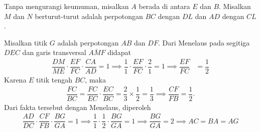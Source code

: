\begin{center}
\end{center}
Tanpa mengurangi keumuman, misalkan $A$ berada di antara $E$ dan $B$. Misalkan $M$ dan $N$ berturut-turut adalah perpotongan $BC$ dengan $DL$ dan $AD$ dengan $CL$.

    Misalkan titik $G$ adalah perpotongan $AB$ dan $DF$.
    Dari Menelaus pada segitiga $DEC$ dan garis transversal $\overline{AMF}$ didapat
    \begin{align*}
        \dfrac{DM}{ME}\cdot \dfrac{EF}{FC} \cdot \dfrac{CA}{AD} = 1 \implies
        \dfrac{1}{1}\cdot \dfrac{EF}{FC} \cdot \dfrac{2}{1} = 1 \implies
        \dfrac{EF}{FC} &= \dfrac{1}{2}
    \end{align*}
    Karena $E$ titik tengah $BC$, maka 
    \begin{align*}
        \dfrac{FC}{BC} = \dfrac{FC}{EC} \cdot \dfrac{EC}{BC} = \dfrac{2}{3} \times \dfrac{1}{2} = \dfrac{1}{3} \implies \dfrac{CF}{FB} = \dfrac{1}{2}.
    \end{align*}
    Dari fakta tersebut dengan Menelaus, diperoleh
    \begin{align*}
        \dfrac{AD}{DC} \cdot \dfrac{CF}{FB} \cdot \dfrac{BG}{GA} = 1 \implies
        \dfrac{1}{1} \cdot \dfrac{1}{2} \cdot \dfrac{BG}{GA} = 1 \implies
        \dfrac{BG}{GA} = 2 \implies
        AC = BA = AG
    \end{align*}

